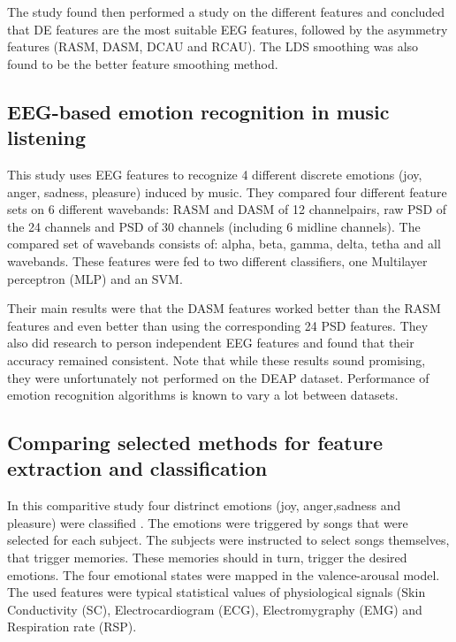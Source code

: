 \npar

The study found then performed a study on the different features and concluded that DE features are the most suitable EEG features, followed by the asymmetry features (RASM, DASM, DCAU and RCAU). The LDS smoothing was also found to be the better feature smoothing method. 

\subsection{EEG-based emotion recognition in music listening}

This study\citep{emorecoghard} uses EEG features to recognize 4 different discrete emotions (joy, anger, sadness, pleasure) induced by music. They compared four different feature sets on 6 different wavebands: RASM and DASM of 12 channelpairs, raw PSD of the 24 channels and PSD of 30 channels (including 6 midline channels). The compared set of wavebands consists of: alpha, beta, gamma, delta, tetha and all wavebands. These features were fed to two different classifiers, one Multilayer perceptron (MLP)  and an SVM. 

\npar

Their main results were that the DASM features worked better than the RASM features and even better than using the corresponding 24 PSD features. They also did research to person independent EEG features and found that their accuracy remained consistent. Note that while these results sound promising, they were unfortunately not performed on the DEAP dataset. Performance of emotion recognition algorithms is known to vary a lot between datasets\citep{PhytoEm}.

\subsection{Comparing selected methods for feature extraction and classification}

In this comparitive study four distrinct emotions (joy, anger,sadness and pleasure) were classified \citep{PhytoEm}. The emotions were triggered by songs that were selected for each subject. The subjects were instructed to select songs themselves, that trigger memories. These memories should in turn, trigger the desired emotions. The four emotional states were mapped in the valence-arousal model. The used features were typical statistical values of physiological signals (Skin Conductivity (SC), Electrocardiogram (ECG), Electromygraphy (EMG) and Respiration rate (RSP). 

